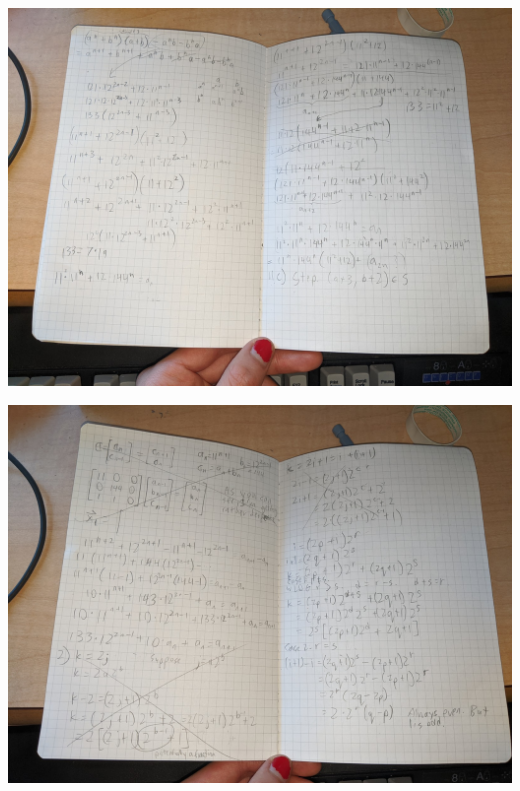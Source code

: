 \documentclass{article}
\numberwithin{subcase}{case}
\begin{document}
\begin{landscape}
    \thispagestyle{empty}
    \includegraphics[width=0.95\linewidth]{3.jpg}
    \pagebreak
    
    \thispagestyle{empty}
    \includegraphics[width=0.95\linewidth]{4.jpg}
\end{landscape}

\restoregeometry
    
\end{document}
